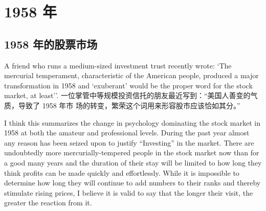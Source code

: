 \chapter{1958 年}

\section{1958 年的股票市场}

\begin{verseparallel}
  {
    \noindent A friend who runs a medium-sized investment trust recently wrote:
    `The mercurial temperament, characteristic of the American people, produced
    a major transformation in 1958 and ‘exuberant’ would be the proper word
    for the stock market, at least''.
  }
  {
    一位掌管中等规模投资信托的朋友最近写到：“美国人善变的气质，导致了 1958 年市
    场的转变，繁荣这个词用来形容股市应该恰如其分。”
  }
\end{verseparallel}

\begin{verseparallel}
  {
    I think this summarizes the change in psychology dominating the stock market in 1958 at both the amateur and
    professional levels. During the past year almost any reason has been seized upon to justify “Investing” in the
    market. There are undoubtedly more mercurially-tempered people in the stock market now than for a good many
    years and the duration of their stay will be limited to how long they think profits can be made quickly and
    effortlessly. While it is impossible to determine how long they will continue to add numbers to their ranks and
    thereby stimulate rising prices, I believe it is valid to say that the longer their visit, the greater the reaction from
    it.
  }
  {
  }
\end{verseparallel}


